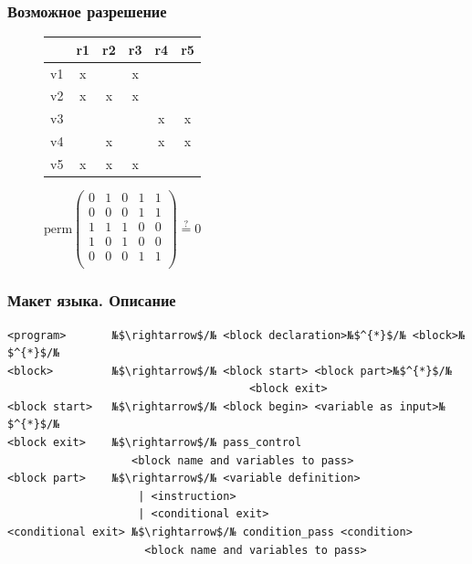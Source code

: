 \documentclass[10pt,a4paper]{beamer}
\begin{document}
\begin{frame}[fragile]
    \frametitle{Возможное разрешение}
    \begin{figure}[h]
        \begin{minipage}[h]{0.47\linewidth}
            \begin{tabular}{*{6}{|c}|}
                \hline
                & r1 & r2 & r3 & r4 & r5\\
                \hline
                v1 & x& & x& & \\
                \hline
                v2 & x& x& x& & \\
                \hline
                v3 & & & & x&x \\
                \hline
                v4 & &x & & x&x \\
                \hline
                v5 & x& x&x & & \\
                \hline
            \end{tabular}
        \end{minipage}
        \begin{minipage}[h]{0.47\linewidth}
            $\text{perm}\left(
            \begin{array}{*{5}{c}}
                0&1&0&1&1\\
                0&0&0&1&1\\
                1&1&1&0&0\\
                1&0&1&0&0\\
                0&0&0&1&1\\
            \end{array}\right) \overset{?}{=} 0$
        \end{minipage}

    \end{figure}

\end{frame}

\begin{frame}[fragile]
    \frametitle{Макет языка. Описание}
\begin{lstlisting}
<program>       №$\rightarrow$/№ <block declaration>№$^{*}$/№ <block>№$^{*}$/№
<block>         №$\rightarrow$/№ <block start> <block part>№$^{*}$/№
                                     <block exit>
<block start>   №$\rightarrow$/№ <block begin> <variable as input>№$^{*}$/№
<block exit>    №$\rightarrow$/№ pass_control
                   <block name and variables to pass>
<block part>    №$\rightarrow$/№ <variable definition> 
                    | <instruction>
                    | <conditional exit>
<conditional exit> №$\rightarrow$/№ condition_pass <condition>
                     <block name and variables to pass>
\end{lstlisting}

\end{frame}
\end{document}
